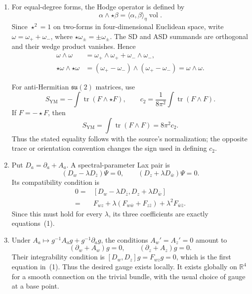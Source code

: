 \begin{enumerate}
  \begin{enumerate}
    \item[(i)]
    For equal-degree forms, the Hodge operator is defined by
    \[
      \alpha\wedge\star\beta
        =\langle\alpha,\beta\rangle_\eta\operatorname{vol}.
    \]
    Since \(\star^2=1\) on two-forms in four-dimensional Euclidean
    space, write
    \(\omega=\omega_++\omega_-\), where
    \(\star\omega_\pm=\pm\omega_\pm\).  The SD and ASD summands are
    orthogonal and their wedge product vanishes.  Hence
    \[
    \begin{split}
      \omega\wedge\omega
        &=\omega_+\wedge\omega_+
          +\omega_-\wedge\omega_-,\\
      \star\omega\wedge\star\omega
        &=(\omega_+-\omega_-)\wedge(\omega_+-\omega_-)
         =\omega\wedge\omega.
    \end{split}
    \]

    For anti-Hermitian \(\mathfrak{su}(2)\) matrices, use
    \[
      S_{\mathrm{YM}}=-\int\operatorname{tr}(F\wedge\star F),
      \qquad
      c_2=\frac1{8\pi^2}
        \int\operatorname{tr}(F\wedge F).
    \]
    If \(F=-\star F\), then
    \[
      \boxed{S_{\mathrm{YM}}
        =\int\operatorname{tr}(F\wedge F)=8\pi^2c_2.}
    \]
    Thus the stated equality follows with the source's normalization;
    the opposite trace or orientation convention changes the sign used
    in defining \(c_2\).

    \item[(ii)]
    Put \(D_a=\partial_a+A_a\).  A spectral-parameter Lax pair is
    \[
      \boxed{(D_w-\lambda D_{\bar z})\Psi=0,
      \qquad
      (D_z+\lambda D_{\bar w})\Psi=0.}
    \]
    Its compatibility condition is
    \[
    \begin{split}
      0={}&[D_w-\lambda D_{\bar z},
             D_z+\lambda D_{\bar w}]\\
       ={}&F_{wz}
          +\lambda(F_{w\bar w}+F_{z\bar z})
          +\lambda^2F_{\bar w\bar z}.
    \end{split}
    \]
    Since this must hold for every \(\lambda\), its three coefficients
    are exactly equations~(1).

    \item[(iii)]
    Under
    \(A_a\mapsto g^{-1}A_ag+g^{-1}\partial_ag\), the conditions
    \(A_w'=A_z'=0\) amount to
    \[
      (\partial_w+A_w)g=0,
      \qquad
      (\partial_z+A_z)g=0.
    \]
    Their integrability condition is
    \([D_w,D_z]g=F_{wz}g=0\), which is the first equation in~(1).
    Thus the desired gauge exists locally.  It exists globally on
    \(\mathbb R^4\) for a smooth connection on the trivial bundle, with
    the usual choice of gauge at a base point.


\end{enumerate}
\end{enumerate}
